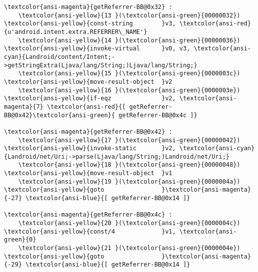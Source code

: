 \documentclass[11pt]{article}
\begin{document}
\begin{Verbatim}[commandchars=\\\{\}]
\textcolor{ansi-magenta}{getReferrer-BB@0x32} : 
	\textcolor{ansi-yellow}{13 }(\textcolor{ansi-green}{00000032}) \textcolor{ansi-yellow}{const-string        }v3, \textcolor{ansi-red}{u'android.intent.extra.REFERRER\_NAME'}
	\textcolor{ansi-yellow}{14 }(\textcolor{ansi-green}{00000036}) \textcolor{ansi-yellow}{invoke-virtual      }v0, v3, \textcolor{ansi-cyan}{Landroid/content/Intent;->getStringExtra(Ljava/lang/String;)Ljava/lang/String;}
	\textcolor{ansi-yellow}{15 }(\textcolor{ansi-green}{0000003c}) \textcolor{ansi-yellow}{move-result-object  }v2
	\textcolor{ansi-yellow}{16 }(\textcolor{ansi-green}{0000003e}) \textcolor{ansi-yellow}{if-eqz              }v2, \textcolor{ansi-magenta}{7} \textcolor{ansi-red}{[ getReferrer-BB@0x42}\textcolor{ansi-green}{ getReferrer-BB@0x4c ]}

\textcolor{ansi-magenta}{getReferrer-BB@0x42} : 
	\textcolor{ansi-yellow}{17 }(\textcolor{ansi-green}{00000042}) \textcolor{ansi-yellow}{invoke-static       }v2, \textcolor{ansi-cyan}{Landroid/net/Uri;->parse(Ljava/lang/String;)Landroid/net/Uri;}
	\textcolor{ansi-yellow}{18 }(\textcolor{ansi-green}{00000048}) \textcolor{ansi-yellow}{move-result-object  }v1
	\textcolor{ansi-yellow}{19 }(\textcolor{ansi-green}{0000004a}) \textcolor{ansi-yellow}{goto                }\textcolor{ansi-magenta}{-27} \textcolor{ansi-blue}{[ getReferrer-BB@0x14 ]}

\textcolor{ansi-magenta}{getReferrer-BB@0x4c} : 
	\textcolor{ansi-yellow}{20 }(\textcolor{ansi-green}{0000004c}) \textcolor{ansi-yellow}{const/4             }v1, \textcolor{ansi-green}{0}
	\textcolor{ansi-yellow}{21 }(\textcolor{ansi-green}{0000004e}) \textcolor{ansi-yellow}{goto                }\textcolor{ansi-magenta}{-29} \textcolor{ansi-blue}{[ getReferrer-BB@0x14 ]}


    \end{Verbatim}


    
    
    
    
\end{document}
